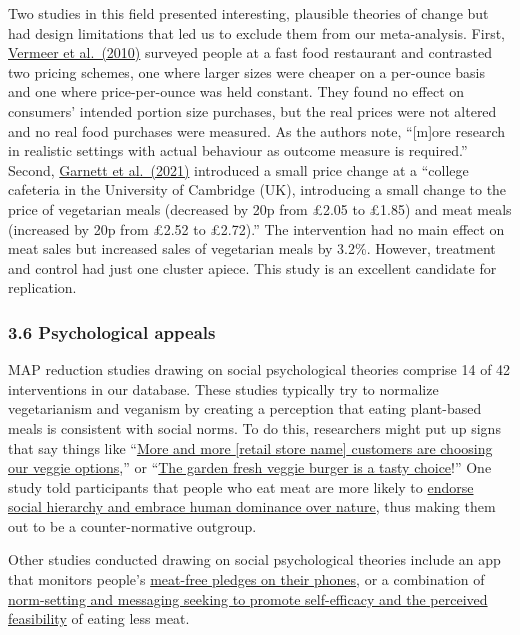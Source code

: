 \documentclass[
  letterpaper,
  DIV=11,
  numbers=noendperiod]{scrartcl}
\begin{document}
Two studies in this field presented interesting, plausible theories of
change but had design limitations that led us to exclude them from our
meta-analysis. First,
\href{https://doi.org/10.1093/eurpub/ckp092}{Vermeer et al.~(2010)}
surveyed people at a fast food restaurant and contrasted two pricing
schemes, one where larger sizes were cheaper on a per-ounce basis and
one where price-per-ounce was held constant. They found no effect on
consumers' intended portion size purchases, but the real prices were not
altered and no real food purchases were measured. As the authors note,
``{[}m{]}ore research in realistic settings with actual behaviour as
outcome measure is required.'' Second,
\href{https://www.sciencedirect.com/science/article/pii/S0272494421000426?via\%3Dihub}{Garnett
et al.~(2021)} introduced a small price change at a ``college cafeteria
in the University of Cambridge (UK), introducing a small change to the
price of vegetarian meals (decreased by 20p from £2.05 to £1.85) and
meat meals (increased by 20p from £2.52 to £2.72).'' The intervention
had no main effect on meat sales but increased sales of vegetarian meals
by 3.2\%. However, treatment and control had just one cluster apiece.
This study is an excellent candidate for replication.

\hypertarget{psychological-appeals}{%
\subsubsection{3.6 Psychological appeals}\label{psychological-appeals}}

MAP reduction studies drawing on social psychological theories comprise
14 of 42 interventions in our database. These studies typically try to
normalize vegetarianism and veganism by creating a perception that
eating plant-based meals is consistent with social norms. To do this,
researchers might put up signs that say things like
``\href{https://doi.org/10.1016/j.appet.2021.105824}{More and more
{[}retail store name{]} customers are choosing our veggie options},'' or
``\href{https://doi.org/10.1016/j.appet.2020.104842}{The garden fresh
veggie burger is a tasty choice}!'' One study told participants that
people who eat meat are more likely to
\href{https://linkinghub.elsevier.com/retrieve/pii/S019566630190474X}{endorse
social hierarchy and embrace human dominance over nature}, thus making
them out to be a counter-normative outgroup.

Other studies conducted drawing on social psychological theories include
an app that monitors people's
\href{https://www.sciencedirect.com/science/article/pii/S0195666321006334?via\%3Dihub\#sec2}{meat-free
pledges on their phones}, or a combination of
\href{https://doi.org/10.1016/j.foodqual.2020.103997}{norm-setting and
messaging seeking to promote self-efficacy and the perceived
feasibility} of eating less meat.
\end{document}

